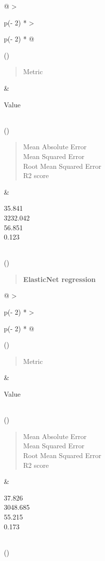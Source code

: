 \documentclass[
]{article}
\begin{document}
\begin{longtable}[]{@{}
  >{\raggedright\arraybackslash}p{(\columnwidth - 2\tabcolsep) * }
  >{\raggedright\arraybackslash}p{(\columnwidth - 2\tabcolsep) * }@{}}
\toprule()
\begin{minipage}[b]{\linewidth}\raggedright
\begin{quote}
Metric
\end{quote}
\end{minipage} & \begin{minipage}[b]{\linewidth}\raggedright
Value
\end{minipage} \\
\midrule()
\endhead
\begin{minipage}[t]{\linewidth}\raggedright
\begin{quote}
Mean Absolute Error\\
Mean Squared Error\\
Root Mean Squared Error\\
R2 score
\end{quote}\strut
\end{minipage} & \begin{minipage}[t]{\linewidth}\raggedright
35.841\\
3232.042\\
56.851\\
0.123\strut
\end{minipage} \\
\bottomrule()
\end{longtable}

\begin{quote}
\textbf{ElasticNet regression}
\end{quote}

\begin{longtable}[]{@{}
  >{\raggedright\arraybackslash}p{(\columnwidth - 2\tabcolsep) * }
  >{\raggedright\arraybackslash}p{(\columnwidth - 2\tabcolsep) * }@{}}
\toprule()
\begin{minipage}[b]{\linewidth}\raggedright
\begin{quote}
Metric
\end{quote}
\end{minipage} & \begin{minipage}[b]{\linewidth}\raggedright
Value
\end{minipage} \\
\midrule()
\endhead
\begin{minipage}[t]{\linewidth}\raggedright
\begin{quote}
Mean Absolute Error\\
Mean Squared Error\\
Root Mean Squared Error\\
R2 score
\end{quote}\strut
\end{minipage} & \begin{minipage}[t]{\linewidth}\raggedright
37.826\\
3048.685\\
55.215\\
0.173\strut
\end{minipage} \\
\bottomrule()
\end{longtable}
\end{document}

